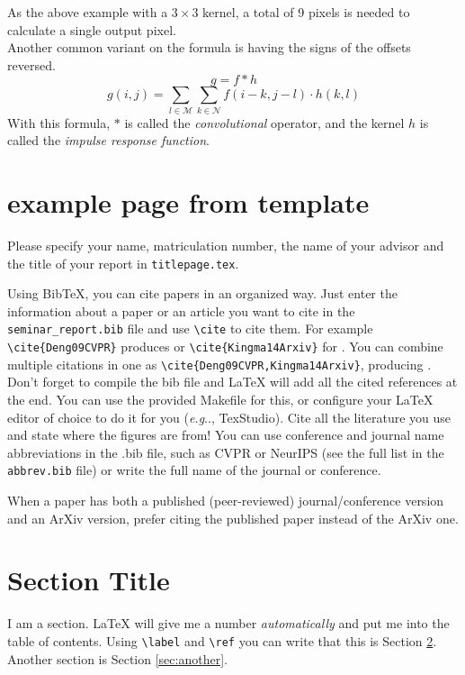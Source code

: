 \documentclass[twoside,a4paper,article]{combine}
\makeatletter
\DeclareRobustCommand\onedot{\futurelet\@let@token\@onedot}
\def\@onedot{\ifx\@let@token.\else.\null\fi\xspace}
\def\eg{\emph{e.g}\onedot} \def\Eg{\emph{E.g}\onedot}
\makeatother
\begin{document}
As the above example with a $3 \times 3$ kernel, a total of 9 pixels is needed to calculate a single output pixel.\\

Another common variant on the formula is having the signs of the offsets reversed.
\[
    g = f \ast h
\]
\[
    g(i,j) = \sum_{l \in \mathscr{M}}\sum_{k \in \mathscr{N}}{f(i-k, j-l) \cdot h(k, l)}
\]
With this formula, $\ast$ is called the \emph{convolutional} operator, and the kernel $h$ is called the \emph{impulse response function}.



\newpage
\section{example page from template}
Please specify your name, matriculation number, the name of your advisor and the title of your report in 
\verb+titlepage.tex+.

Using BibTeX, you can cite papers in an organized way.
Just enter the information about a paper or an article you want to cite in the \texttt{seminar\_report.bib} file and use \verb+\cite+ to cite them. For example \verb+\cite{Deng09CVPR}+ produces \cite{Deng09CVPR} or \verb+\cite{Kingma14Arxiv}+ for \cite{Kingma14Arxiv}. You can combine multiple citations in one as \verb+\cite{Deng09CVPR,Kingma14Arxiv}+, producing \cite{Deng09CVPR,Kingma14Arxiv}.
Don't forget to compile the bib file and LaTeX will add all the cited references at the end. You can use the provided Makefile for this, or configure your LaTeX editor of choice to do it for you (\eg, TexStudio).
Cite all the literature you use and state where the figures are from! You can use conference and journal name abbreviations in the .bib file, such as CVPR or NeurIPS (see the full list in the \texttt{abbrev.bib} file) or write the full name of the journal or conference.

When a paper has both a published (peer-reviewed) journal/conference version and an ArXiv version, prefer citing the published paper instead of the ArXiv one.

\section{Section Title}
\label{sec:firstsection}
I am a section. LaTeX will give me a number \emph{automatically} and put me into the table of contents.
Using \verb+\label+ and \verb+\ref+ you can write that this is Section \ref{sec:firstsection}. Another section is Section \ref{sec:another}.
\end{document}
